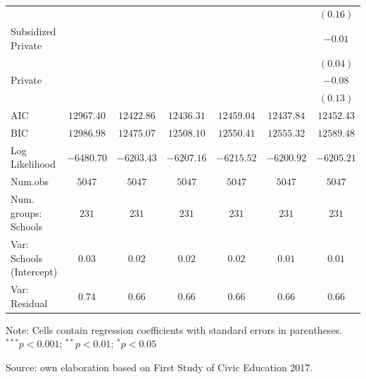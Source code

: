 \documentclass[
  12pt,
  letterpaper,
]{article}
\begin{document}
\begin{table}
{\begin{center}
{\begin{threeparttable}
\begin{tabular}{l c c c c c c}
                                                       &              &               &               &               &               & $(0.16)$      \\
\quad Subsidized Private                               &              &               &               &               &               & $-0.01$       \\
                                                       &              &               &               &               &               & $(0.04)$      \\
\quad Private                                          &              &               &               &               &               & $-0.08$       \\
                                                       &              &               &               &               &               & $(0.13)$      \\
\midrule
AIC                                                    & $12967.40$   & $12422.86$    & $12436.31$    & $12459.04$    & $12437.84$    & $12452.43$    \\
BIC                                                    & $12986.98$   & $12475.07$    & $12508.10$    & $12550.41$    & $12555.32$    & $12589.48$    \\
Log Likelihood                                         & $-6480.70$   & $-6203.43$    & $-6207.16$    & $-6215.52$    & $-6200.92$    & $-6205.21$    \\
Num.obs                                                & $5047$       & $5047$        & $5047$        & $5047$        & $5047$        & $5047$        \\
Num. groups: Schools                                   & $231$        & $231$         & $231$         & $231$         & $231$         & $231$         \\
Var: Schools (Intercept)                               & $0.03$       & $0.02$        & $0.02$        & $0.02$        & $0.01$        & $0.01$        \\
Var: Residual                                          & $0.74$       & $0.66$        & $0.66$        & $0.66$        & $0.66$        & $0.66$        \\
\bottomrule
\end{tabular}
\begin{tablenotes}[flushleft]
\scriptsize{\item Note: Cells contain regression coefficients with standard errors in parentheses. $^{***}p<0.001$; $^{**}p<0.01$; $^{*}p<0.05$ \\ \item Source: own elaboration based on First Study of Civic Education 2017.}
\end{tablenotes}
\end{threeparttable}
}
\caption{}
\label{table:coefficients}
\end{center}

}

\end{table}%
\end{document}
